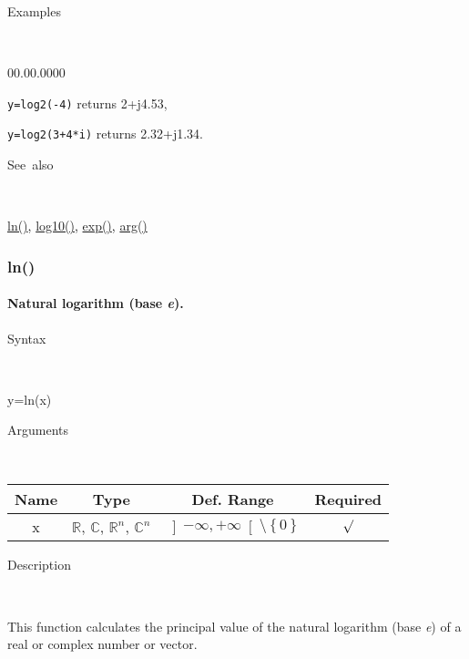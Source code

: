 \begin{description}
\item [Examples]~
\end{description}
\begin{lyxlist}{00.00.0000}
\item [\texttt{y=log2(-4)}]returns 2+j4.53,
\item [\texttt{y=log2(3+4{*}i)}]returns 2.32+j1.34.
\end{lyxlist}
\begin{description}
\item [See~also]~
\end{description}
\noindent \textcolor{blue}{\hyperlink{ln}{ln()}}\textcolor{black}{,}
\textcolor{blue}{\hyperlink{log10}{log10()}}\textcolor{black}{,}
\textcolor{blue}{\hyperlink{exp}{exp()}}\textcolor{black}{,} \textcolor{blue}{\hyperlink{arg}{arg()}}


\newpage
\subsubsection*{\hypertarget{ln}{}{\Large ln()}}


\paragraph{\label{par:Natural-logarithm}Natural logarithm (base \textit{e}).}

\begin{description}
\item [Syntax]~
\end{description}
y=ln(x)

\begin{description}
\item [Arguments]~
\end{description}
\begin{tabular}{|c|c|c|c|}
\hline 
Name&
Type&
Def. Range&
Required\tabularnewline
\hline
\hline 
x&
$\mathbb{R}$, $\mathbb{C}$, $\mathbb{R}^{n}$, $\mathbb{C}^{n}$&
$\left]-\infty,+\infty\right[\setminus\left\{ 0\right\} $&
$\surd$\tabularnewline
\hline
\end{tabular}

\begin{description}
\item [Description]~
\end{description}
This function calculates the principal value of the natural logarithm
(base \textit{e}) of a real or complex number or vector.

